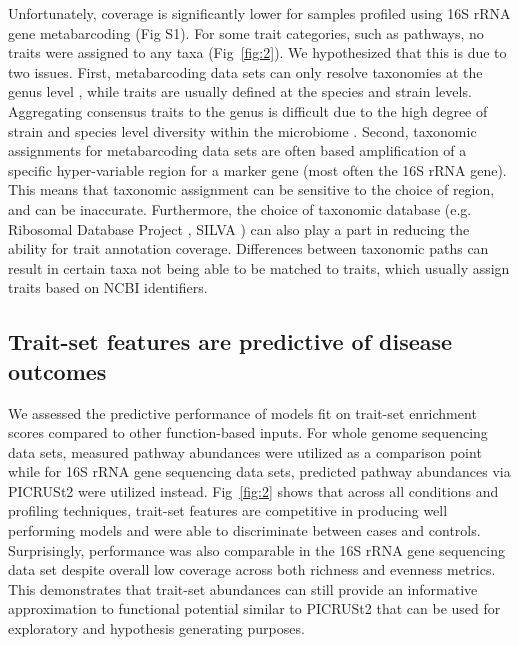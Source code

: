 \documentclass[10pt,letterpaper]{article}
\begin{document}
Unfortunately, coverage is significantly lower for samples profiled using 16S rRNA gene metabarcoding (Fig S1). For some trait categories, such as pathways, no traits were assigned to any taxa (Fig~\ref{fig:2}). We hypothesized that this is due to two issues. First, metabarcoding data sets can only resolve taxonomies at the genus level \cite{johnson2019evaluation}, while traits are usually defined at the species and strain levels. Aggregating consensus traits to the genus is difficult due to the high degree of strain and species level diversity within the microbiome \cite{carrow2020strain}. Second, taxonomic assignments for metabarcoding data sets are often based amplification of a specific hyper-variable region for a marker gene (most often the 16S rRNA gene). This means that taxonomic assignment can be sensitive to the choice of region, and can be inaccurate. Furthermore, the choice of taxonomic database (e.g. Ribosomal Database Project \cite{cole2014ribosomal}, SILVA \cite{quast2013silva}) can also play a part in reducing the ability for trait annotation coverage. Differences between taxonomic paths \cite{balvociute2017silva} can result in certain taxa not being able to be matched to traits, which usually assign traits based on NCBI identifiers.  

\subsection*{Trait-set features are predictive of disease outcomes}

We assessed the predictive performance of models fit on trait-set enrichment scores compared to other function-based inputs. For whole genome sequencing data sets, measured pathway abundances were utilized as a comparison point while for 16S rRNA gene sequencing data sets, predicted pathway abundances via PICRUSt2 were utilized instead. Fig~\ref{fig:2} shows that across all conditions and profiling techniques, trait-set features are competitive in producing well performing models and were able to discriminate between cases and controls. Surprisingly, performance was also comparable in the 16S rRNA gene sequencing data set despite overall low coverage across both richness and evenness metrics. This demonstrates that trait-set abundances can still provide an informative approximation to functional potential similar to PICRUSt2 that can be used for exploratory and hypothesis generating purposes.   
\end{document}

